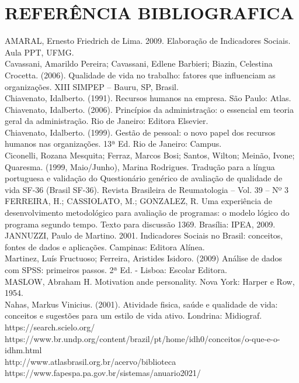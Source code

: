 \documentclass[a4paper, 10pt]{article}
\begin{document}
       \section{REFERÊNCIA BIBLIOGRAFICA}
\noindent 
AMARAL, Ernesto Friedrich de Lima. 2009. Elaboração de Indicadores Sociais. Aula PPT, UFMG.
\\
Cavassani, Amarildo Pereira; Cavassani, Edlene Barbieri; Biazin, Celestina Crocetta.
(2006). Qualidade de vida no trabalho: fatores que influenciam as organizações. XIII
SIMPEP – Bauru, SP, Brasil.
\\
Chiavenato, Idalberto. (1991). Recursos humanos na empresa. São Paulo: Atlas.
Chiavenato, Idalberto. (2006). Princípios da administração: o essencial em teoria
geral da administração. Rio de Janeiro: Editora Elsevier.
\\
Chiavenato, Idalberto. (1999). Gestão de pessoal: o novo papel dos recursos
humanos nas organizações. 13ª Ed. Rio de Janeiro: Campus.
\\
Ciconelli, Rozana Mesquita; Ferraz, Marcos Bosi; Santos, Wilton; Meinão, Ivone;
Quaresma. (1999, Maio/Junho), Marina Rodrigues. Tradução para a língua
portuguesa e validação do Questionário genérico de avaliação de qualidade de vida
SF-36 (Brasil SF-36). Revista Brasileira de Reumatologia – Vol. 39 – Nº 3
\\
FERREIRA, H.; CASSIOLATO, M.; GONZALEZ, R. Uma experiência de desenvolvimento metodológico para avaliação de programas: o modelo lógico do programa segundo tempo. Texto para discussão 1369. Brasília: IPEA, 2009.
\\
JANNUZZI, Paulo de Martino. 2001. Indicadores Sociais no Brasil: conceitos, fontes de dados e aplicações. Campinas: Editora Alínea.
\\
Martinez, Luís Fructuoso; Ferreira, Aristides Isidoro. (2009) Análise de dados com
SPSS: primeiros passos. 2ª Ed. - Lisboa: Escolar Editora.
\\
MASLOW, Abraham H. Motivation ande personality. Nova York: Harper e Row, 1954.
\\
Nahas, Markus Vinicius. (2001). Atividade fisica, saúde e qualidade de vida:
conceitos e sugestões para um estilo de vida ativo. Londrina: Midiograf.
\\
https://search.scielo.org/
\\
https://www.br.undp.org/content/brazil/pt/home/idh0/conceitos/o-que-e-o-idhm.html
\\
http://www.atlasbrasil.org.br/acervo/biblioteca
\\
https://www.fapespa.pa.gov.br/sistemas/anuario2021/
\end{document}
